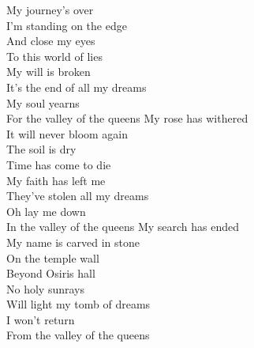 
My journey's over\\
I'm standing on the edge\\
And close my eyes\\
To this world of lies\\
My will is broken\\
It's the end of all my dreams\\
My soul yearns\\
For the valley of the queens
\hops
My rose has withered\\
It will never bloom again\\
The soil is dry\\
Time has come to die\\
My faith has left me\\
They've stolen all my dreams\\
Oh lay me down\\
In the valley of the queens
\hops
My search has ended\\
My name is carved in stone\\
On the temple wall\\
Beyond Osiris hall\\
No holy sunrays\\
Will light my tomb of dreams\\
I won't return\\
From the valley of the queens